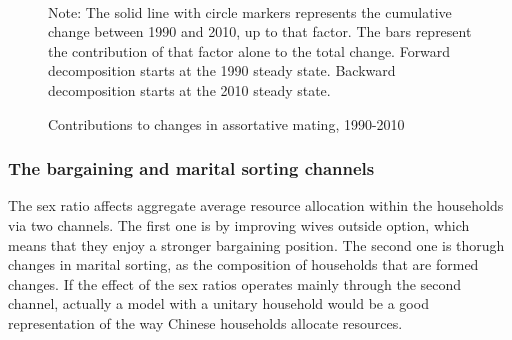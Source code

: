 \documentclass[12pt]{article}
\newcommand{\note}[1]{\caption*{Note: {#1}} }
\begin{document}
\begin{figure}[hp]
	\centering
	\caption{Contributions to changes in assortative mating, 1990-2010}\label{fig:decomp_ms}
	\\
	\note{The solid line with circle markers represents the cumulative change between 1990 and 2010, up to that factor. The bars represent the contribution of that factor alone to the total change. Forward decomposition starts at the 1990 steady state. Backward decomposition starts at the 2010 steady state.}
\end{figure}

\subsubsection{The bargaining and marital sorting channels}

The sex ratio affects aggregate average resource allocation within the households via two channels. The first one is by improving wives outside option, which means that they enjoy a stronger bargaining position. The second one is thorugh changes in marital sorting, as the composition of households that are formed changes. If the effect of the sex ratios operates mainly through the second channel, actually a model with a unitary household would be a good representation of the way Chinese households allocate resources. 
\end{document}
